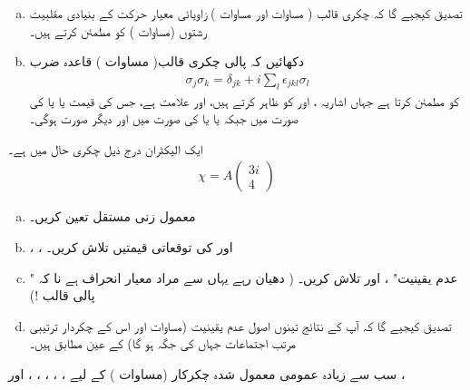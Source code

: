 \begin{enumerate}[a.]
\item
 تصدیق کیجیے گا کہ چکری  قالب  (  مساوات  اور  مساوات ) زاویائی معیار حرکت کے بنیادی مقلبیت رشتوں (مساوات )   کو مطمئن کرتے ہیں۔ 
\item
 دکھائیں کہ پالی چکری قالب(  مساوات )    قاعدہ ضرب
\begin{align}
\sigma_j\sigma_k = \delta_{jk}+i\sum_l \epsilon_{jkl}\sigma_l
\end{align}
  کو مطمئن کرتا ہے  جہاں اشاریہ  ،  اور   کو ظاہر کرتے ہیں،  اور    علامت   ہے،    جس کی قیمت   یا   یا   کی صورت میں   جبکہ   یا  یا   کی صورت  میں    اور     دیگر صورت   ہوگی۔ 
  \end{enumerate}
ایک الیکٹران  درج ذیل چکری حال میں ہے۔
\begin{align*}
\chi =A\begin{pmatrix}
3i \\ 4
\end{pmatrix} 
\end{align*}
\begin{enumerate}[a.]
\item
معمول زنی  مستقل   تعین  کریں۔
\item
 ،  ، اور    کی توقعاتی   قیمتیں تلاش کریں۔
\item 
"  عدم یقینیت"   ،         اور     تلاش کریں۔ ( دھیان رہے  یہاں  سے مراد معیار انحراف ہے نا کہ   پالی  قالب !)
\item  
  تصدیق کیجیے  گا کہ آپ کے نتائج تینوں اصول عدم  یقینیت (مساوات  اور اس کے  چکردار  ترتیبی  مرتب اجتماعات   جہاں   کی جگہ  ہو گا)  کے عین مطابق ہیں۔
\end{enumerate}
  سب سے زیادہ عمومی معمول شدہ    چکرکار     (مساوات )   کے لیے ،   ،  ،  ،  ، اور   ،
